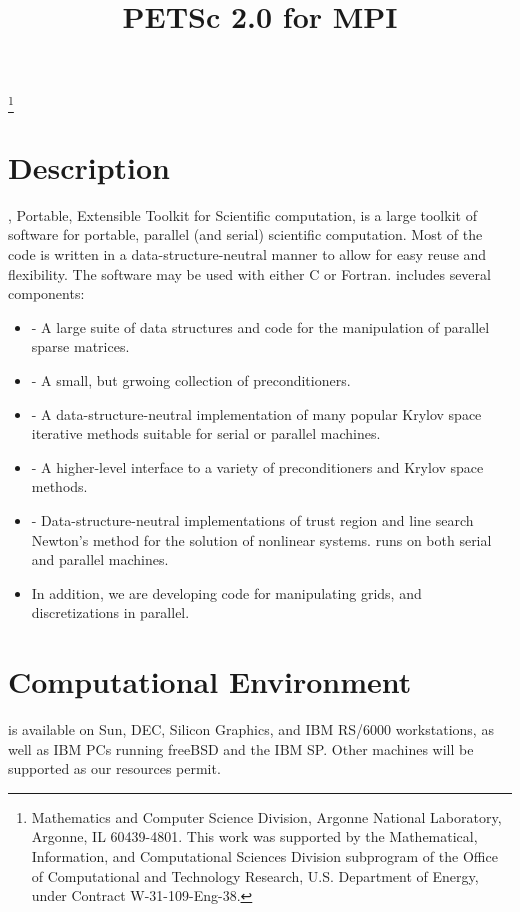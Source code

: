 \pagestyle{empty}

\pagestyle{empty}
\title{PETSc 2.0 for MPI}
\thanks{Mathematics and Computer Science Division,
Argonne National Laboratory,
Argonne, IL 60439-4801.
This work was supported by the Mathematical,
        Information, and Computational Sciences Division subprogram of
        the Office of Computational and Technology Research,
        U.S. Department of Energy, under Contract W-31-109-Eng-38.}

\date{}
\maketitle

\section*{Description}

, Portable, Extensible Toolkit for Scientific computation,
is a large toolkit of software for portable, 
parallel (and serial) scientific computation. Most of the 
code is written in a data-structure-neutral manner to 
allow for easy reuse and flexibility.
The  software may be used with either C or Fortran.
 includes several components:
\begin{itemize}
\item {} - A large suite of data structures and code
      for the manipulation of parallel sparse matrices.
\item {} - A small, but grwoing collection of preconditioners.
\item {} - A data-structure-neutral implementation of
      many popular Krylov space iterative methods suitable for 
      serial or parallel machines.
\item {} - A higher-level interface to a variety
      of preconditioners and Krylov space methods.
\item {} - Data-structure-neutral 
      implementations of trust region and line search Newton's 
      method for the solution of nonlinear systems.  runs 
      on both serial and parallel machines.  
\item In addition, we are developing code for manipulating grids, 
      and discretizations in parallel.
\end{itemize}

\section*{Computational Environment}
 is available on Sun, DEC, Silicon Graphics, and IBM
RS/6000 workstations, as well as IBM PCs running freeBSD and the
IBM SP. Other machines will be supported as our resources permit.

